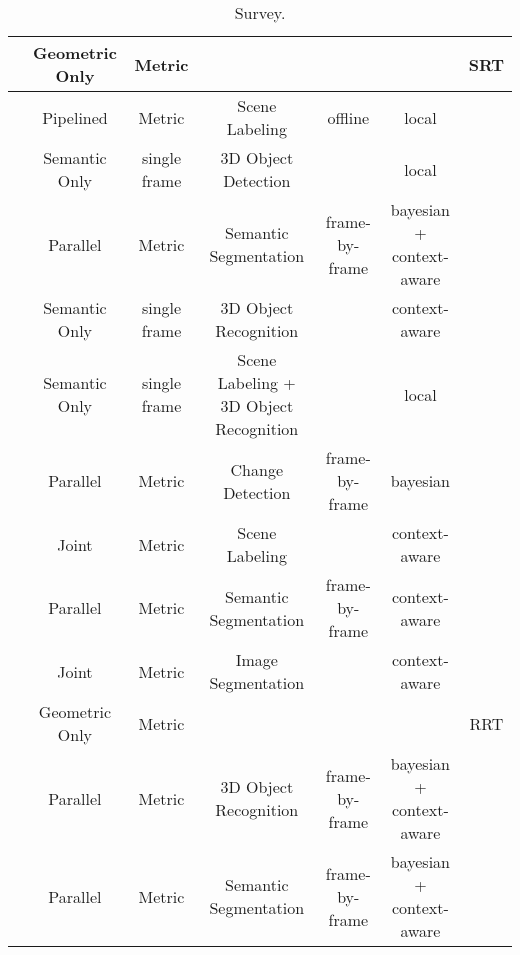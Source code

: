 \begin{sidewaystable}
{\begin{tabular}{|l|c|c|c|c|c|c|}
			\hline 			 
			\cite{el2013improved} & Geometric Only & Metric &  &  &  & SRT \\ 
			\hline 			 
			\cite{anand2013ijrr} & Pipelined & Metric & Scene Labeling & offline & local & \\ 
			\hline 			 
			\cite{lin2013iccv} & Semantic Only & single frame & 3D Object Detection &  & local & \\ 
			\hline 			 
			\cite{hermans2014dense} & Parallel & Metric & Semantic Segmentation & frame-by-frame & bayesian + context-aware & \\ 
			\hline 			 
			\cite{kunze2014iros} & Semantic Only & single frame & 3D Object Recognition & & context-aware & \\ 
			\hline 			 
			\cite{ciocarlie2014towards} & Semantic Only & single frame & Scene Labeling + 3D Object Recognition & & local &  \\ 
			\hline 			 
			\cite{herbst2014icra} & Parallel & Metric & Change Detection & frame-by-frame & bayesian & \\ 
			\hline 			 
			\cite{kundu2014eccv} & Joint & Metric & Scene Labeling &  & context-aware & \\ 
			\hline 			 
			\cite{vineet2015icra} & Parallel & Metric & Semantic Segmentation & frame-by-frame & context-aware &  \\ 
			\hline 			 
			\cite{blaha2016cvpr} & Joint & Metric & Image Segmentation &  & context-aware & \\ 
			\hline 			
			\cite{bircher2016icra} & Geometric Only & Metric & &  &  & RRT \\ 
			\hline 			 
			\cite{ruiz2017building} & Parallel & Metric & 3D Object Recognition & frame-by-frame & bayesian + context-aware & \\ 
			\hline 			 
			\cite{mccormac2017semanticfusion} & Parallel & Metric & Semantic Segmentation & frame-by-frame & bayesian + context-aware & \\ 
			\hline 			 
		\end{tabular}}
		\caption{Survey.}
		\label{tab:survey}
	\end{sidewaystable}